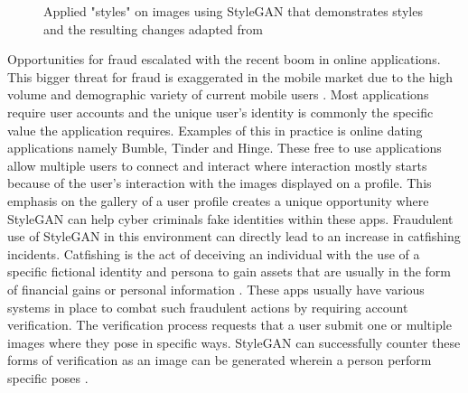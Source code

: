 \begin{figure}[H]%
\centering
{}%
\caption{Applied "styles" on images using StyleGAN that demonstrates styles and the resulting changes adapted from \cite{Karras2019}}%
\label{fig:1}%
\end{figure}

Opportunities for fraud escalated with the recent boom in online applications. This bigger threat for fraud is exaggerated in the mobile market due to the high volume and demographic variety of current mobile users \citep{Mitra2021}. Most applications require user accounts and the unique user’s identity is commonly the specific value the application requires. Examples of this in practice is online dating applications namely Bumble, Tinder and Hinge. These free to use applications allow multiple users to connect and interact where interaction mostly starts because of the user’s interaction with the images displayed on a profile. This emphasis on the gallery of a user profile creates a unique opportunity where StyleGAN can help cyber criminals fake identities within these apps. Fraudulent use of StyleGAN in this environment can directly lead to an increase in catfishing incidents. Catfishing is the act of deceiving an individual with the use of a specific fictional identity and persona to gain assets that are usually in the form of financial gains or personal information \citep{Chandler2016}. These apps usually have various systems in place to combat such fraudulent actions by requiring account verification. The verification process requests that a user submit one or multiple images where they pose in specific ways. StyleGAN can successfully counter these forms of verification as an image can be generated wherein a person perform specific poses \citep{Karras2019}.

